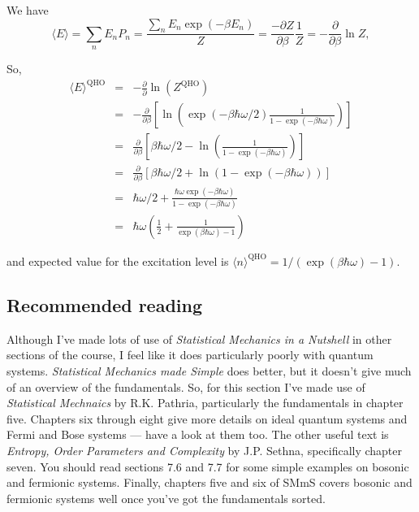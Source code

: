 We have
$$
	\langle E\rangle = \sum_n E_n P_n = \frac{\sum_n E_n \exp(-\beta E_n)}{Z} = \frac{-\partial Z}{\partial \beta}\frac{1}{Z} = -\frac{\partial}{\partial \beta}\ln{Z},
$$

So,
\begin{eqnarray*}
	\langle E\rangle^\text{QHO} &=& -\frac{\partial}{\partial}\ln(Z^\text{QHO})\\
	&=&  -\frac{\partial}{\partial\beta} \left[\ln\left( \exp(-\beta\hbar\omega/2)\frac{1}{1-\exp(-\beta\hbar\omega)}\right) \right] \\
	&=& \frac{\partial}{\partial \beta} \left[ \beta\hbar\omega/2 - \ln\left(\frac{1}{1-\exp(-\beta\hbar\omega)}\right)\right]\\
	&=& \frac{\partial}{\partial \beta} \left[ \beta\hbar\omega/2 + \ln\left({1-\exp(-\beta\hbar\omega)}\right)\right]\\
	&=& \hbar\omega/2 + \frac{\hbar\omega\exp(-\beta\hbar\omega)}{1-\exp(-\beta\hbar\omega)}\\
	&=& \hbar\omega\left(\frac12 +\frac{1}{\exp(\beta\hbar\omega)-1}\right)
\end{eqnarray*}

and expected value for the excitation level is $\langle n\rangle^\text{QHO} = 1/(\exp(\beta\hbar\omega)-1)$.
\subsection{Recommended reading}
Although I've made lots of use of \emph{Statistical Mechanics in a Nutshell} in other sections of the course, I feel like it does particularly poorly with quantum systems. \emph{Statistical Mechanics made Simple} does better, but it doesn't give much of an overview of the fundamentals. So, for this section I've made use of \emph{Statistical Mechnaics} by R.K. Pathria, particularly the fundamentals in chapter five. Chapters six through eight give more details on ideal quantum systems and Fermi and Bose systems --- have a look at them too. The other useful text is \emph{Entropy, Order Parameters and Complexity} by J.P. Sethna, specifically chapter seven. You should read sections 7.6 and 7.7 for some simple examples on bosonic and fermionic systems. Finally, chapters five and six of SMmS covers bosonic and fermionic systems well once you've got the fundamentals sorted.
